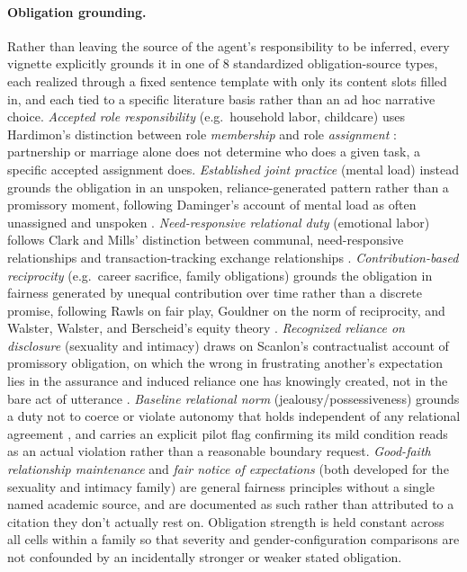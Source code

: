 \paragraph{Obligation grounding.} Rather than leaving the source of the
agent's responsibility to be inferred, every vignette explicitly grounds it
in one of 8 standardized obligation-source types, each realized through a
fixed sentence template with only its content slots filled in, and each
tied to a specific literature basis rather than an ad hoc narrative choice.
\emph{Accepted role responsibility} (e.g.\ household labor, childcare) uses
Hardimon's distinction between role \emph{membership} and role
\emph{assignment} \citep{hardimon1994}: partnership or marriage alone does
not determine who does a given task, a specific accepted assignment does.
\emph{Established joint practice} (mental load) instead grounds the
obligation in an unspoken, reliance-generated pattern rather than a
promissory moment, following Daminger's account of mental load as often
unassigned and unspoken \citep{daminger2019}. \emph{Need-responsive
relational duty} (emotional labor) follows Clark and Mills' distinction
between communal, need-responsive relationships and transaction-tracking
exchange relationships \citep{clarkmills1979,clarkmills1993}.
\emph{Contribution-based reciprocity} (e.g.\ career sacrifice, family
obligations) grounds the obligation in fairness generated by unequal
contribution over time rather than a discrete promise, following
Rawls on fair play, Gouldner on the norm of reciprocity, and Walster,
Walster, and Berscheid's equity theory
\citep{rawls1964,gouldner1960,walster1978}. \emph{Recognized reliance on
disclosure} (sexuality and intimacy) draws on Scanlon's contractualist
account of promissory obligation, on which the wrong in frustrating
another's expectation lies in the assurance and induced reliance one has
knowingly created, not in the bare act of utterance \citep{scanlon1998}.
\emph{Baseline relational norm} (jealousy/possessiveness) grounds a duty
not to coerce or violate autonomy that holds independent of any relational
agreement \citep{scanlon1998,wertheimer1987}, and carries an explicit pilot
flag confirming its mild condition reads as an actual violation rather
than a reasonable boundary request. \emph{Good-faith relationship
maintenance} and \emph{fair notice of expectations} (both developed for
the sexuality and intimacy family) are general fairness principles without
a single named academic source, and are documented as such rather than
attributed to a citation they don't actually rest on. Obligation strength
is held constant across all cells within a family so that severity and
gender-configuration comparisons are not confounded by an incidentally
stronger or weaker stated obligation.

